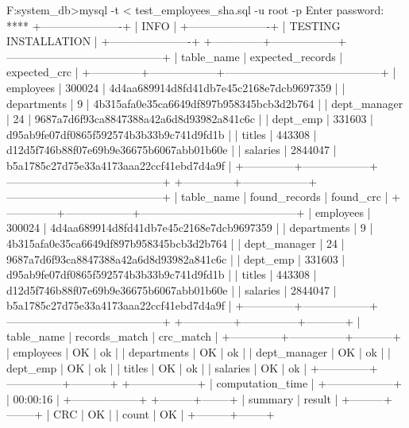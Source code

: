 F:\OneDrive\USTH{}\Information system\test_db>mysql -t < test_employees_sha.sql -u root -p
Enter password: ****
+----------------------+
| INFO                 |
+----------------------+
| TESTING INSTALLATION |
+----------------------+
+--------------+------------------+------------------------------------------+
| table_name   | expected_records | expected_crc                             |
+--------------+------------------+------------------------------------------+
| employees    |           300024 | 4d4aa689914d8fd41db7e45c2168e7dcb9697359 |
| departments  |                9 | 4b315afa0e35ca6649df897b958345bcb3d2b764 |
| dept_manager |               24 | 9687a7d6f93ca8847388a42a6d8d93982a841c6c |
| dept_emp     |           331603 | d95ab9fe07df0865f592574b3b33b9c741d9fd1b |
| titles       |           443308 | d12d5f746b88f07e69b9e36675b6067abb01b60e |
| salaries     |          2844047 | b5a1785c27d75e33a4173aaa22ccf41ebd7d4a9f |
+--------------+------------------+------------------------------------------+
+--------------+------------------+------------------------------------------+
| table_name   | found_records    | found_crc                                |
+--------------+------------------+------------------------------------------+
| employees    |           300024 | 4d4aa689914d8fd41db7e45c2168e7dcb9697359 |
| departments  |                9 | 4b315afa0e35ca6649df897b958345bcb3d2b764 |
| dept_manager |               24 | 9687a7d6f93ca8847388a42a6d8d93982a841c6c |
| dept_emp     |           331603 | d95ab9fe07df0865f592574b3b33b9c741d9fd1b |
| titles       |           443308 | d12d5f746b88f07e69b9e36675b6067abb01b60e |
| salaries     |          2844047 | b5a1785c27d75e33a4173aaa22ccf41ebd7d4a9f |
+--------------+------------------+------------------------------------------+
+--------------+---------------+-----------+
| table_name   | records_match | crc_match |
+--------------+---------------+-----------+
| employees    | OK            | ok        |
| departments  | OK            | ok        |
| dept_manager | OK            | ok        |
| dept_emp     | OK            | ok        |
| titles       | OK            | ok        |
| salaries     | OK            | ok        |
+--------------+---------------+-----------+
+------------------+
| computation_time |
+------------------+
| 00:00:16         |
+------------------+
+---------+--------+
| summary | result |
+---------+--------+
| CRC     | OK     |
| count   | OK     |
+---------+--------+
